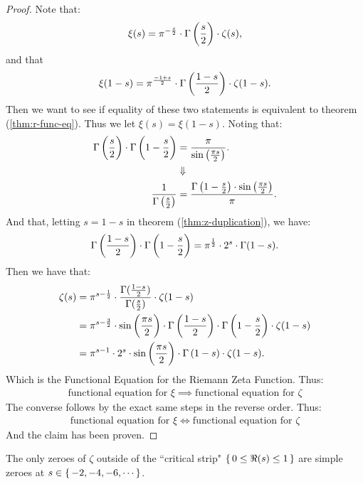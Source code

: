 \begin{proof}
Note that:
\begin{align*}
    \xi(s) = \pi^{-\frac{s}{2}} \cdot \Gamma\left( \frac{s}{2} \right) \cdot \zeta(s),
\end{align*}
and that
\begin{align*}
    \xi(1-s) = \pi^{\frac{-1+s}{2}} \cdot \Gamma\left( \frac{1-s}{2} \right) \cdot \zeta(1-s).
\end{align*}
Then we want to see if equality of these two statements is equivalent to theorem (\ref{thm:r-func-eq}). Thus we let $\xi(s) = \xi(1-s)$. Noting that:
\begin{align*}
    \Gamma\left( \frac{s}{2} \right) \cdot \Gamma\left( 1- \frac{s}{2} \right) &= \frac{\pi}{ \sin\left( \frac{\pi s}{2} \right) }.\\
    &\Downarrow\\
    \frac{1}{\Gamma\left( \frac{s}{2} \right)} &= \frac{\Gamma\left( 1- \frac{s}{2} \right) \cdot \sin\left( \frac{\pi s}{2} \right) }{\pi}.
\end{align*}
And that, letting $s = 1-s$ in theorem (\ref{thm:z-duplication}), we have:
\begin{align*}
     \Gamma\left( \frac{1-s}{2} \right) \cdot \Gamma\left( 1-\frac{s}{2} \right) = \pi ^{\frac{1}{2}} \cdot 2^{s} \cdot \Gamma(1-s).
\end{align*}
Then we have that:
\begin{align*}
    \zeta(s) &= \pi^{s - \frac{1}{2}} \cdot \frac{\Gamma(\frac{1-s}{2})}{\Gamma(\frac{s}{2})} \cdot \zeta(1-s)\\
    &= \pi^{s - \frac{3}{2}}\cdot \sin\left( \frac{\pi s}{2} \right) \cdot \Gamma\left( \frac{1-s}{2} \right) \cdot \Gamma\left( 1- \frac{s}{2} \right) \cdot    \zeta(1-s)\\
    &= \pi^{s - 1} \cdot 2^s \cdot \sin\left( \frac{\pi s}{2} \right) \cdot \Gamma\left( 1-s \right)  \cdot    \zeta(1-s).
\end{align*}
Which is the Functional Equation for the Riemann Zeta Function. Thus:
\begin{align*}
    \text{functional equation for $\xi$} \implies\text{functional equation for $\zeta$}
\end{align*}
The converse follows by the exact same steps in the reverse order. Thus:
\begin{align*}
    \text{functional equation for $\xi$} \iff \text{functional equation for $\zeta$}
\end{align*}
And the claim has been proven.
\end{proof}

\begin{corollary}
The only zeroes of $\zeta$ outside of the ``critical strip" $\set{ 0 \leq \Re(s) \leq 1}$ are simple zeroes at $s \in \set{-2, -4, -6, \cdots}$.
\end{corollary}


